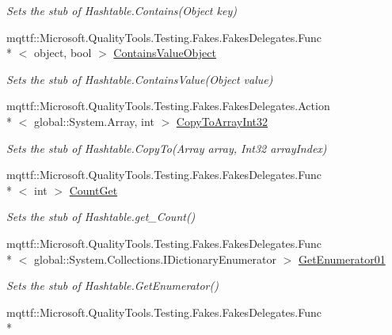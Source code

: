 \begin{DoxyCompactItemize}
\begin{DoxyCompactList}\small\item\em Sets the stub of Hashtable.\-Contains(\-Object key)\end{DoxyCompactList}\item 
mqttf\-::\-Microsoft.\-Quality\-Tools.\-Testing.\-Fakes.\-Fakes\-Delegates.\-Func\\*
$<$ object, bool $>$ \hyperlink{class_system_1_1_collections_1_1_fakes_1_1_stub_hashtable_a9fb29a369faf4bad9f3dda90a4a4c4be}{Contains\-Value\-Object}
\begin{DoxyCompactList}\small\item\em Sets the stub of Hashtable.\-Contains\-Value(\-Object value)\end{DoxyCompactList}\item 
mqttf\-::\-Microsoft.\-Quality\-Tools.\-Testing.\-Fakes.\-Fakes\-Delegates.\-Action\\*
$<$ global\-::\-System.\-Array, int $>$ \hyperlink{class_system_1_1_collections_1_1_fakes_1_1_stub_hashtable_a007d6c4df01954fefc218484e76ea72d}{Copy\-To\-Array\-Int32}
\begin{DoxyCompactList}\small\item\em Sets the stub of Hashtable.\-Copy\-To(\-Array array, Int32 array\-Index)\end{DoxyCompactList}\item 
mqttf\-::\-Microsoft.\-Quality\-Tools.\-Testing.\-Fakes.\-Fakes\-Delegates.\-Func\\*
$<$ int $>$ \hyperlink{class_system_1_1_collections_1_1_fakes_1_1_stub_hashtable_ada50443bc702e95194614c9ea54e5d57}{Count\-Get}
\begin{DoxyCompactList}\small\item\em Sets the stub of Hashtable.\-get\-\_\-\-Count()\end{DoxyCompactList}\item 
mqttf\-::\-Microsoft.\-Quality\-Tools.\-Testing.\-Fakes.\-Fakes\-Delegates.\-Func\\*
$<$ global\-::\-System.\-Collections.\-I\-Dictionary\-Enumerator $>$ \hyperlink{class_system_1_1_collections_1_1_fakes_1_1_stub_hashtable_a581d2229581c8623952f0b75261e6683}{Get\-Enumerator01}
\begin{DoxyCompactList}\small\item\em Sets the stub of Hashtable.\-Get\-Enumerator()\end{DoxyCompactList}\item 
mqttf\-::\-Microsoft.\-Quality\-Tools.\-Testing.\-Fakes.\-Fakes\-Delegates.\-Func\\*

\end{DoxyCompactItemize}
